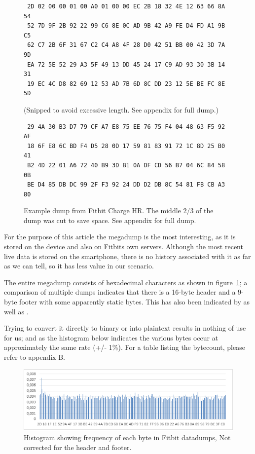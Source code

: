 \documentclass[a4paper,11pt,dvips]{article}
\begin{document}
\begin{figure}
\begin{verbatim}
 2D 02 00 00 01 00 A0 01 00 00 EC 2B 18 32 4E 12 63 66 8A 54
 52 7D 9F 2B 92 22 99 C6 8E 0C AD 9B 42 A9 FE D4 FD A1 9B C5
 62 C7 2B 6F 31 67 C2 C4 A8 4F 28 D0 42 51 BB 00 42 3D 7A 9D
 EA 72 5E 52 29 A3 5F 49 13 DD 45 24 17 C9 AD 93 30 3B 14 31
 19 EC 4C D8 82 69 12 53 AD 7B 6D 8C DD 23 12 5E BE FC 8E 5D
\end{verbatim}
(Snipped to avoid excessive length. See appendix for full dump.)
\begin{verbatim}
 29 4A 30 B3 D7 79 CF A7 E8 75 EE 76 75 F4 04 48 63 F5 92 AF
 18 6F E8 6C BD F4 D5 28 0D 17 59 81 83 91 72 1C 8D 25 B0 41
 B2 4D 22 01 A6 72 40 B9 3D B1 0A DF CD 56 B7 04 6C 84 58 0B
 BE D4 85 DB DC 99 2F F3 92 24 DD D2 DB 8C 54 81 FB CB A3 80
\end{verbatim}
\caption{Example dump from Fitbit Charge HR. The middle 2/3 of the dump was cut to save space. See appendix for full dump.}
\label{fig:megadump}
\end{figure}

For the purpose of this article the megadump is the most interesting, as it is stored on the device and also on Fitbits own servers. Although the most recent live data is stored on the smartphone, there is no history associated with it as far as we can tell, so it has less value in our scenario.

The entire megadump consists of hexadecimal characters as shown in figure~\ref{fig:megadump}; a comparison of multiple dumps indicates that there is a 16-byte header and a 9-byte footer with some apparently static bytes. This has also been indicated by \cite{Allard:2014a} as well as \cite{Aprville:2015b}.

Trying to convert it directly to binary or into plaintext results in nothing of use for us; and as the histogram below indicates the various bytes occur at approximately the same rate (+/- 1\%). For a table listing the bytecount, please refer to appendix B.

\begin{figure}
\noindent
\includegraphics[natwidth=624bp,natheight=184bp,width=\linewidth]{histogram_meta}
\caption{Histogram showing frequency of each byte in Fitbit datadumps, Not corrected for the header and footer.}
\label{fig:histogram_meta}
\end{figure}
\end{document}
